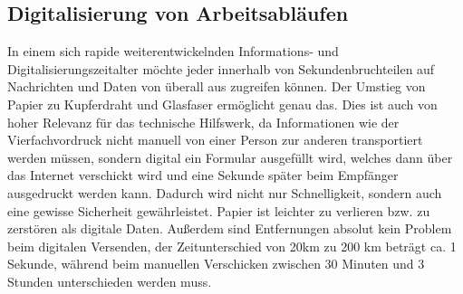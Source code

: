 \subsection{Digitalisierung von Arbeitsabläufen}
In einem sich rapide weiterentwickelnden Informations- und Digitalisierungszeitalter möchte jeder innerhalb von Sekundenbruchteilen auf Nachrichten und Daten von überall aus zugreifen können. Der Umstieg von Papier zu Kupferdraht und Glasfaser ermöglicht genau das. Dies ist auch von hoher Relevanz für das technische Hilfswerk, da Informationen wie der Vierfachvordruck nicht manuell von einer Person zur anderen transportiert werden müssen, sondern digital ein Formular ausgefüllt wird, welches dann über das Internet verschickt wird und eine Sekunde später beim Empfänger ausgedruckt werden kann. Dadurch wird nicht nur Schnelligkeit, sondern auch eine gewisse Sicherheit gewährleistet. Papier ist leichter zu verlieren bzw. zu zerstören als digitale Daten. Außerdem sind Entfernungen absolut kein Problem beim digitalen Versenden, der Zeitunterschied von 20km zu 200 km beträgt ca. 1 Sekunde, während beim manuellen Verschicken zwischen 30 Minuten und 3 Stunden unterschieden werden muss.